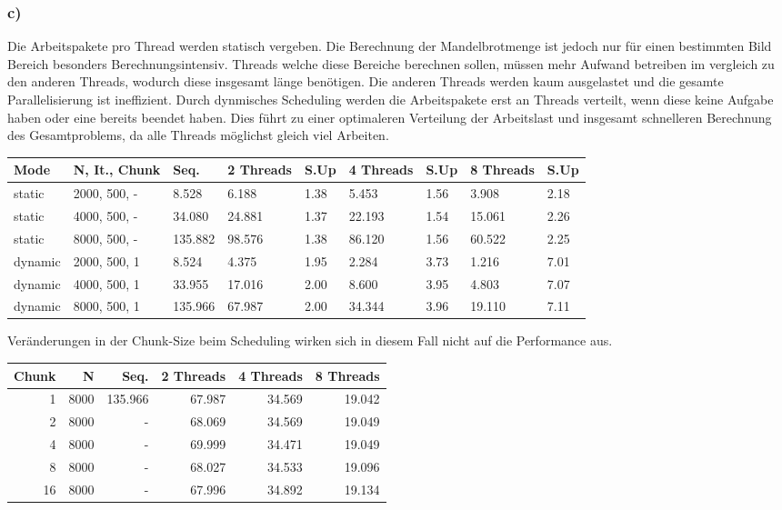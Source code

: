 \documentclass{report}
\begin{document}
		\subsubsection{c)}
			Die Arbeitspakete pro Thread werden statisch vergeben. 
			Die Berechnung der Mandelbrotmenge ist jedoch nur für einen bestimmten Bild Bereich besonders Berechnungsintensiv. 
			Threads welche diese Bereiche berechnen sollen, müssen mehr Aufwand betreiben im vergleich zu den anderen Threads, wodurch diese insgesamt länge benötigen.
			Die anderen Threads werden kaum ausgelastet und die gesamte Parallelisierung ist ineffizient.
			Durch dynmisches Scheduling werden die Arbeitspakete erst an Threads verteilt, wenn diese keine Aufgabe haben oder eine bereits beendet haben.
			Dies führt zu einer optimaleren Verteilung der Arbeitslast und insgesamt schnelleren Berechnung des Gesamtproblems, da alle Threads möglichst gleich viel Arbeiten.
	
			\begin{center}
				\begin{tabular}{|p{1.5cm}|p{2cm}|p{1cm}|p{1cm}|p{1cm}|p{1cm}|p{1cm}|p{1cm}|p{1cm}|}
					\hline
					Mode & N, It., Chunk & Seq. & 2 Threads & S.Up & 4 Threads & S.Up & 8 Threads & S.Up \\
					\hline
					static & 2000, 500, - & 8.528  & 6.188  & 1.38 & 5.453  & 1.56 & 3.908  & 2.18\\
					static & 4000, 500, - & 34.080  & 24.881  & 1.37 & 22.193  & 1.54 & 15.061  & 2.26 \\
					static & 8000, 500, - & 135.882  & 98.576  & 1.38 & 86.120  & 1.56  & 60.522  & 2.25 \\
					\hline
					dynamic & 2000, 500, 1 & 8.524  & 4.375  & 1.95 & 2.284 & 3.73 & 1.216 & 7.01 \\
					dynamic & 4000, 500, 1 & 33.955  & 17.016 & 2.00 & 8.600 & 3.95 & 4.803 & 7.07 \\
					dynamic & 8000, 500, 1 & 135.966  & 67.987 & 2.00 & 34.344 & 3.96 & 19.110 & 7.11 \\
					\hline
				\end{tabular}
			\end{center}
			
			Veränderungen in der Chunk-Size beim Scheduling wirken sich in diesem Fall nicht auf die Performance aus.
			
			\begin{center}
				\begin{tabular}{|r|r|r|r|r|r|}
					\hline
					Chunk & N & Seq. & 2 Threads & 4 Threads & 8 Threads \\
					\hline
					1 & 8000 & 135.966 & 67.987  & 34.569  & 19.042  \\
					\hline
					2 & 8000 & - & 68.069 & 34.569  & 19.049  \\
					\hline
					4 & 8000 & - & 69.999  & 34.471  & 19.049  \\
					\hline
					8 & 8000 & - & 68.027  & 34.533  & 19.096  \\
					\hline
					16 & 8000 & - & 67.996  & 34.892  & 19.134  \\
					\hline
				\end{tabular}
			\end{center}
\end{document}
